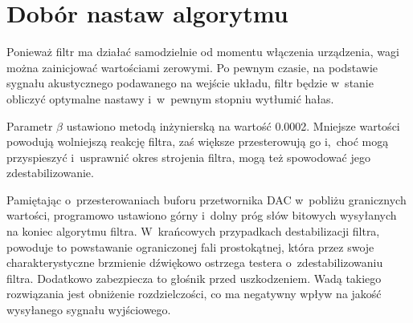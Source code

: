 \section{Dobór nastaw algorytmu}
Ponieważ filtr ma działać samodzielnie od momentu włączenia urządzenia, wagi można zainicjować wartościami zerowymi. Po pewnym czasie, na podstawie sygnału akustycznego podawanego na wejście układu, filtr będzie w~stanie obliczyć optymalne nastawy i~w~pewnym stopniu wytłumić hałas.

Parametr $\beta$ ustawiono metodą inżynierską na wartość 0.0002. Mniejsze wartości powodują wolniejszą reakcję filtra, zaś większe przesterowują go i,~choć mogą przyspieszyć i~usprawnić okres strojenia filtra, mogą też spowodować jego zdestabilizowanie.

Pamiętając o~przesterowaniach buforu przetwornika DAC w~pobliżu granicznych wartości, programowo ustawiono górny i~dolny próg słów bitowych wysyłanych na koniec algorytmu filtra. W~krańcowych przypadkach destabilizacji filtra, powoduje to powstawanie ograniczonej fali prostokątnej, która przez swoje charakterystyczne brzmienie dźwiękowo ostrzega testera o~zdestabilizowaniu filtra. Dodatkowo zabezpiecza to głośnik przed uszkodzeniem. Wadą takiego rozwiązania jest obniżenie rozdzielczości, co ma negatywny wpływ na jakość wysyłanego sygnału wyjściowego.